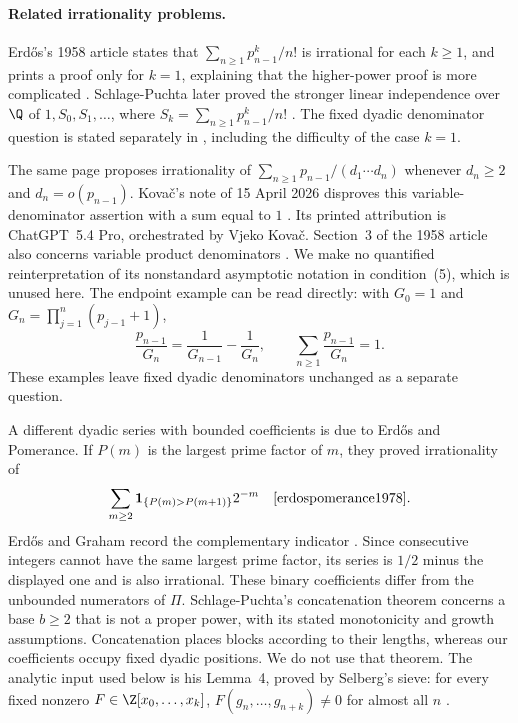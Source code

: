 \paragraph{Related irrationality problems.}
Erd\H{o}s's 1958 article states that
$\sum_{n\ge1}p_{n-1}^k/n!$ is irrational for each $k\ge1$, and prints
a proof only for $k=1$, explaining that the higher-power proof is more
complicated \cite[pp.~93--95]{erdos1958}.
Schlage-Puchta later proved the stronger linear independence over $\Q$
of $1,S_0,S_1,\ldots$, where $S_k=\sum_{n\ge1}p_{n-1}^k/n!$
\cite[Theorem~3]{schlagepuchta2011}.
The fixed dyadic denominator question is stated separately in
\cite[p.~103]{erdos1988}, including the difficulty of the case $k=1$.

The same page proposes irrationality of
$\sum_{n\ge1}p_{n-1}/(d_1\cdots d_n)$ whenever $d_n\ge2$ and
$d_n=o(p_{n-1})$.  Kova\v{c}'s note of 15 April 2026 disproves this
variable-denominator assertion with a sum equal to $1$
\cite[Theorem~1 and proof, pp.~1--2]{kovac2026}.
Its printed attribution is ChatGPT~5.4 Pro, orchestrated by Vjeko Kova\v{c}.
Section~3 of the 1958 article also concerns variable product denominators
\cite[pp.~96--97]{erdos1958}.  We make no quantified reinterpretation
of its nonstandard asymptotic notation in condition~(5), which is unused
here.  The endpoint example can be read directly: with
$G_0=1$ and $G_n=\prod_{j=1}^n(p_{j-1}+1)$,
\[
 \frac{p_{n-1}}{G_n}=\frac1{G_{n-1}}-\frac1{G_n},\qquad
 \sum_{n\ge1}\frac{p_{n-1}}{G_n}=1.
\]
These examples leave fixed dyadic denominators unchanged as a separate
question.

A different dyadic series with bounded coefficients is due to Erd\H{o}s
and Pomerance.  If $P(m)$ is the largest prime factor of $m$, they proved
irrationality of
\[
 \sum_{m\ge2}\mathbf1_{\{P(m)>P(m+1)\}}2^{-m}
 \quad\text{\cite[\S7, p.~320]{erdospomerance1978}}.
\]
Erd\H{o}s and Graham record the complementary indicator
\cite[p.~62]{erdosgraham1980}.  Since consecutive integers cannot have
the same largest prime factor, its series is $1/2$ minus the displayed
one and is also irrational.  These binary coefficients differ from the
unbounded numerators of $\Pi$.
Schlage-Puchta's concatenation theorem
\cite[Theorem~2, p.~1]{schlagepuchta2011} concerns a base $b\ge2$ that
is not a proper power, with its stated monotonicity and growth assumptions.
Concatenation places blocks according to their lengths, whereas our
coefficients occupy fixed dyadic positions.  We do not use that theorem.
The analytic input used below is his Lemma~4, proved by Selberg's sieve:
for every fixed nonzero $F\in\Z[x_0,\ldots,x_k]$,
$F(g_n,\ldots,g_{n+k})\ne0$ for almost all $n$
\cite[Lemma~4, pp.~5--6]{schlagepuchta2011}.

